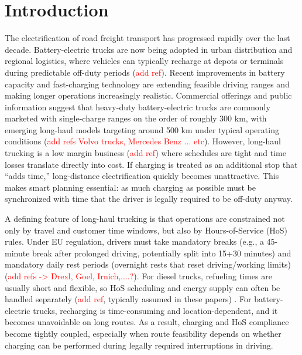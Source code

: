 \documentclass[trsc,dblanonrev]{informs4}
\newcommand{\red}[1]{{\textcolor{red}{#1}}}
\begin{document}

\maketitle


\section{Introduction}
\label{sec:Intro}

    The electrification of road freight transport has progressed rapidly over the last decade. Battery-electric trucks are now being adopted in urban distribution and regional logistics, where vehicles can typically recharge at depots or terminals during predictable off-duty periods (\red{add ref}). Recent improvements in battery capacity and fast-charging technology are extending feasible driving ranges and making longer operations increasingly realistic. Commercial offerings and public information suggest that heavy-duty battery-electric trucks are commonly marketed with single-charge ranges on the order of roughly 300 km, with emerging long-haul models targeting around 500 km under typical operating conditions (\red{add refs Volvo trucks, Mercedes Benz ... etc}). However, long-haul trucking is a low margin business (\red{add ref}) where schedules are tight and time losses translate directly into cost. If charging is treated as an additional stop that “adds time,” long-distance electrification quickly becomes unattractive. This makes smart planning essential: as much charging as possible must be synchronized with time that the driver is legally required to be off-duty anyway.

    A defining feature of long-haul trucking is that operations are constrained not only by travel and customer time windows, but also by Hours-of-Service (HoS) rules. Under EU regulation, drivers must take mandatory breaks (e.g., a 45-minute break after prolonged driving, potentially split into 15+30 minutes) and mandatory daily rest periods (overnight rests that reset driving/working limits) (\red{add refs -> Drexl, Goel,  Irnich,....?}). For diesel trucks, refueling times are usually short and flexible, so HoS scheduling and energy supply can often be handled separately (\red{add ref}, typically assumed in these papers) . For battery-electric trucks, recharging is time-consuming and location-dependent, and it becomes unavoidable on long routes. As a result, charging and HoS compliance become tightly coupled, especially when route feasibility depends on whether charging can be performed during legally required interruptions in driving.
\end{document}
